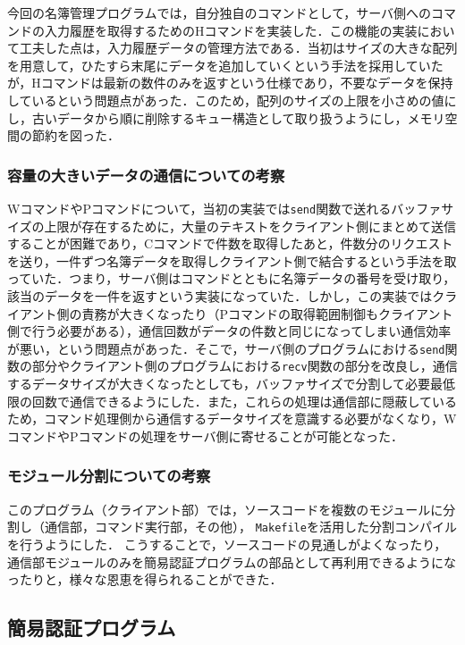 \documentclass[11pt]{jsarticle}
\begin{document}
今回の名簿管理プログラムでは，自分独自のコマンドとして，サーバ側へのコマンドの入力履歴を取得するためのHコマンドを実装した．この機能の実装において工夫した点は，入力履歴データの管理方法である．当初はサイズの大きな配列を用意して，ひたすら末尾にデータを追加していくという手法を採用していたが，Hコマンドは最新の数件のみを返すという仕様であり，不要なデータを保持しているという問題点があった．このため，配列のサイズの上限を小さめの値にし，古いデータから順に削除するキュー構造として取り扱うようにし，メモリ空間の節約を図った．

\subsubsection{容量の大きいデータの通信についての考察}

WコマンドやPコマンドについて，当初の実装では{\tt send}関数で送れるバッファサイズの上限が存在するために，大量のテキストをクライアント側にまとめて送信することが困難であり，Cコマンドで件数を取得したあと，件数分のリクエストを送り，一件ずつ名簿データを取得しクライアント側で結合するという手法を取っていた．つまり，サーバ側はコマンドとともに名簿データの番号を受け取り，該当のデータを一件を返すという実装になっていた．しかし，この実装ではクライアント側の責務が大きくなったり（Pコマンドの取得範囲制御もクライアント側で行う必要がある），通信回数がデータの件数と同じになってしまい通信効率が悪い，という問題点があった．そこで，サーバ側のプログラムにおける{\tt send}関数の部分やクライアント側のプログラムにおける{\tt recv}関数の部分を改良し，通信するデータサイズが大きくなったとしても，バッファサイズで分割して必要最低限の回数で通信できるようにした．また，これらの処理は通信部に隠蔽しているため，コマンド処理側から通信するデータサイズを意識する必要がなくなり，WコマンドやPコマンドの処理をサーバ側に寄せることが可能となった．

\subsubsection{モジュール分割についての考察}

このプログラム（クライアント部）では，ソースコードを複数のモジュールに分割し（通信部，コマンド実行部，その他），
{\tt Makefile}を活用した分割コンパイルを行うようにした．
こうすることで，ソースコードの見通しがよくなったり，
通信部モジュールのみを簡易認証プログラムの部品として再利用できるようになったりと，様々な恩恵を得られることができた．

\subsection{簡易認証プログラム}
\end{document}
